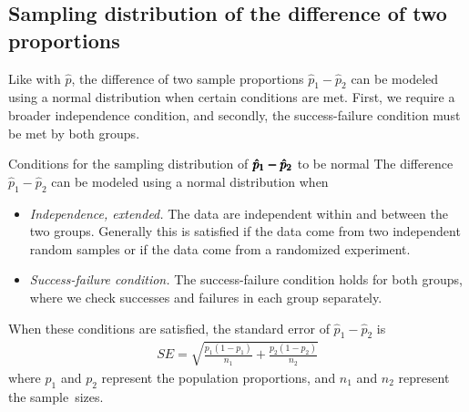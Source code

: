\subsection{Sampling distribution of the difference
    of two proportions}

Like with $\hat{p}$, the difference of two sample
proportions $\hat{p}_1 - \hat{p}_2$ can be modeled
using a normal distribution when certain conditions
are met.
First, we require a broader independence condition,
and secondly,
the success-failure condition must be met by both groups.

\begin{onebox}{Conditions for the
    sampling distribution of
    $\pmb{\hat{\MakeLowercase{p}}_1 -
        \hat{\MakeLowercase{p}}_2}$
    to be normal}
  The difference $\hat{p}_1 - \hat{p}_2$ can be modeled
  using a normal distribution when
  \begin{itemize}
  \setlength{\itemsep}{0mm}
  \item \emph{Independence, extended.}
    The data are independent within and between
    the two groups.
    Generally this is satisfied if the data come
    from two independent random samples
    or if the data come from a randomized experiment.
  \item \emph{Success-failure condition.}
    The success-failure condition holds for both
    groups, where we check successes and failures
    in each group separately.
  \end{itemize}
  When these conditions are satisfied,
  the standard error of $\hat{p}_1 - \hat{p}_2$ is
  \begin{eqnarray*}
  SE %
    = \sqrt{\frac{p_1(1-p_1)}{n_1} + \frac{p_2(1-p_2)}{n_2}}
  \label{seForDiffOfProp}
  \end{eqnarray*}
  where $p_1$ and $p_2$ represent the population proportions,
  and $n_1$ and $n_2$ represent the sample~sizes.
\end{onebox}


